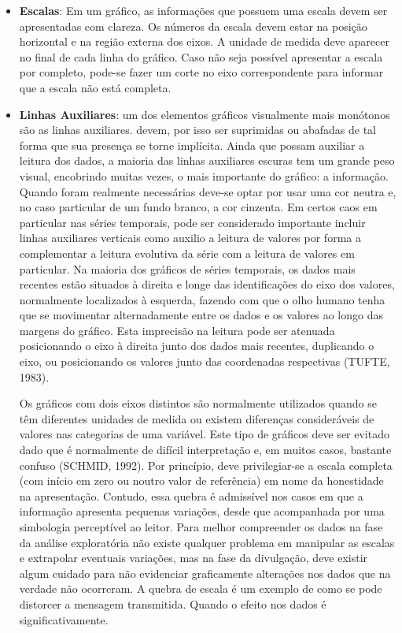 \begin{itemize}
informar o leitor e obrigar quem faz o gráfico a estruturar a informação (CLEVELANDO e MCGILL, 1984a).
\item \textbf{Escalas}: Em um gráfico, as informações que possuem uma escala devem ser apresentadas com clareza. Os números da escala devem estar na posição horizontal e na região externa dos eixos. A unidade de medida deve aparecer no final de cada linha do gráfico. Caso não seja possível apresentar a escala por completo, pode-se fazer um corte no eixo correspondente para informar que a escala não está completa.

\newpage
\item \textbf{Linhas Auxiliares}: um dos elementos gráficos visualmente mais mo\-nó\-to\-nos são as linhas auxiliares. devem, por isso ser suprimidas ou abafadas de tal forma que sua presença se torne implícita. Ainda que possam auxiliar a leitura dos dados, a maioria das linhas auxiliares escuras tem um grande peso visual, encobrindo muitas vezes, o mais importante do gráfico: a informação. Quando foram realmente necessárias deve-se optar por usar uma cor neutra e, no caso particular de um fundo branco, a cor cinzenta. Em certos caos em particular nas séries temporais, pode ser considerado importante incluir linhas auxiliares verticais como auxilio a leitura de valores por forma a complementar a leitura evolutiva da série com a leitura de valores em particular. Na maioria dos gráficos de séries temporais, os dados mais recentes estão situados à direita e longe das identificações do eixo dos valores, normalmente localizados à esquerda, fazendo com que o olho humano tenha que se movimentar alternadamente entre os dados e os valores ao longo das margens do gráfico. Esta imprecisão na leitura pode ser atenuada posicionando o eixo à direita junto dos dados mais recentes, duplicando o eixo, ou posicionando os valores junto das coordenadas respectivas (TUFTE, 1983).\vskip0.3cm

Os gráficos com dois eixos distintos são normalmente utilizados quando se têm diferentes unidades de medida ou existem diferenças consideráveis de valores nas categorias de uma variável. Este tipo de gráficos deve ser evitado dado que é normalmente de difícil interpretação e, em muitos casos, bastante confuso (SCHMID, 1992). Por princípio, deve privilegiar-se a escala completa (com início em zero ou noutro valor de referência) em nome da honestidade na apresentação. Contudo, essa quebra é admissível nos casos em que a informação apresenta pequenas variações, desde que acompanhada por uma simbologia perceptível ao leitor. Para melhor compreender os dados na fase da análise exploratória não existe qualquer problema em manipular as escalas e extrapolar eventuais variações, mas na fase da divulgação, deve existir algum cuidado para não evidenciar graficamente alterações nos dados que na verdade não ocorreram. A quebra de escala é um exemplo de como se pode distorcer a mensagem transmitida. Quando o efeito nos dados é significativamente. 
\end{itemize}

